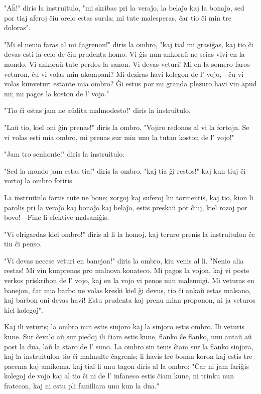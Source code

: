\documentclass[ngerman,12pt,twoside]{book}
\begin{document}
"Aĥ!" diris la instruitulo, "mi skribas pri la veraĵo, la belaĵo kaj la bonaĵo, sed por tiaj aferoj ĉiu orelo estas surda; mi tute malesperas, ĉar tio ĉi min tre doloras".

"Mi el nenio faras al mi ĉagrenon!" diris la ombro, "kaj tial mi grasiĝas, kaj tio ĉi devas esti la celo de ĉiu prudenta homo. Vi ĝis nun ankoraŭ ne scias vivi en la mondo. Vi ankoraŭ tute perdos la sanon. Vi devas veturi! Mi en la somero faros veturon, ĉu vi volas min akompani? Mi deziras havi kolegon de l' vojo,---ĉu vi volas kunveturi estante mia ombro? Ĝi estus por mi granda plezuro havi vin apud mi; mi pagos la koston de l' vojo."

"Tio ĉi estas jam ne aŭdita malmodesto!" diris la instruitulo.

"Laŭ tio, kiel oni ĝin prenas!" diris la ombro. "Vojiro redonos al vi la fortojn. Se vi volas esti mia ombro, mi prenas sur min unu la tutan koston de l' vojo!"

"Jam tro senhonte!" diris la instruitulo.

"Sed la mondo jam estas tia!" diris la ombro, "kaj tia ĝi restos!" kaj kun tiuj ĉi vortoj la ombro foriris.

La instruitulo fartis tute ne bone; zorgoj kaj suferoj lin tormentis, kaj tio, kion li parolis pri la veraĵo kaj bonaĵo kaj belaĵo, estis preskaŭ por ĉiuj, kiel rozoj por bovo!---Fine li efektive malsaniĝis.

"Vi elrigardas kiel ombro!" diris al li la homoj, kaj teruro prenis la instruitulon ĉe tiu ĉi penso.

"Vi devas necese veturi en banejon!" diris la ombro, kiu venis al li. "Nenio alia restas! Mi vin kunprenos pro malnova konateco. Mi pagos la vojon, kaj vi poste verkos priskribon de l' vojo, kaj en la vojo vi penos min malenuigi. Mi veturas en banejon, ĉar mia barbo ne volas kreski kiel ĝi devus, tio ĉi ankaŭ estas malsano, kaj barbon oni devas havi! Estu prudenta kaj prenu mian proponon, ni ja veturos kiel kolegoj".

Kaj ili veturis; la ombro nun estis sinjoro kaj la sinjoro estis ombro. Ili veturis kune. Sur ĉevalo aŭ sur piedoj ili ĉiam estis kune, flanko ĉe flanko, unu antaŭ aŭ post la dua, laŭ la staro de l' suno. La ombro sin tenis ĉiam sur la flanko sinjora, kaj la instruitulon tio ĉi malmulte ĉagrenis; li havis tre bonan koron kaj estis tre pacema kaj amikema, kaj tial li unu tagon diris al la ombro: "Ĉar ni jam fariĝis kolegoj de vojo kaj al tio ĉi ni de l' infaneco estis ĉiam kune, ni trinku nun fratecon, kaj ni estu pli familiara unu kun la dua."
\end{document}
